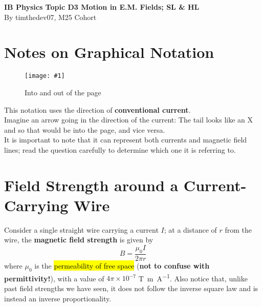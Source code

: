 \documentclass[a4paper,12pt]{article}
\let\oldsection\section
\renewcommand\section{\clearpage\oldsection}
\let\oldsi\si
\renewcommand{\si}[1]{\oldsi[per-mode=reciprocal-positive-first]{#1}}
\newcommand{\lb}{\\[8pt]}
\newcommand{\img}[4]{\begin{center}
  \begin{figure}[H]
    \centering
    \texttt{[image: \#1]}
    \caption{#3}
    \label{fig:#4}
  \end{figure}
\end{center}}
\begin{document}
\pagestyle{fancy}


\begin{titlepage}
  \begin{center}

    \vspace*{8cm}
    \textbf{\Large {IB Physics Topic D3 Motion in E.M. Fields; SL \& HL}} \\
    \vspace*{1cm}
    \large{By timthedev07, M25 Cohort}


  \end{center}
\end{titlepage}

\pagebreak
\tableofcontents
\pagebreak

\clearpage
\setcounter{page}{1}

\section{Notes on Graphical Notation}

\img{intooutof.jpg}{0.6}{Into and out of the page}{intooutof}

This notation uses the direction of \textbf{conventional current}.\lb
Imagine an arrow going in the direction of the current: The tail looks like an X and so that would be into the page, and vice versa.\lb
It is important to note that it can represent both currents and magnetic field lines; read the question carefully to determine which one it is referring to.

\section{Field Strength around a Current-Carrying Wire}

Consider a single straight wire carrying a current $I$; at a distance of $r$ from the wire, the \textbf{magnetic field strength} is given by
\begin{equation}\label{eq:wire_fieldstrength}
  B = \frac{\mu_0I}{2\pi r}
\end{equation}
where $\mu_0$ is the \hl{permeability of free space} (\textbf{not to confuse with permittivity!}), with a value of $4\pi \times 10^{-7}$ \si{\tesla\metre\per\ampere}.
Also notice that, unlike past field strengths we have seen, it does not follow the inverse square law and is instead an inverse proportionality.

\pagebreak
\end{document}
